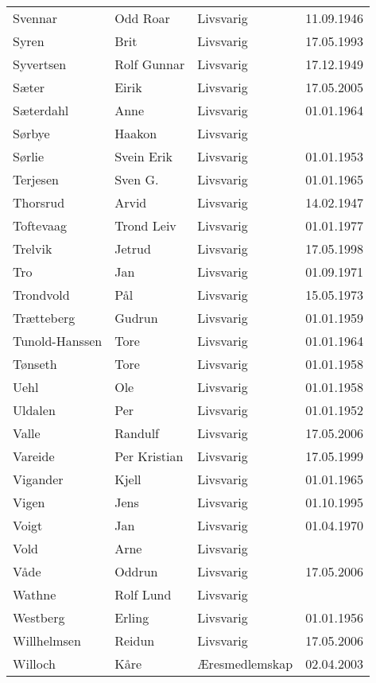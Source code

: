 \begin{longtable}{llll}
        Svennar	&	Odd Roar	&	Livsvarig 	&	11.09.1946	\\
        Syren	&	Brit	&	Livsvarig 	&	17.05.1993	\\
        Syvertsen	&	Rolf Gunnar	&	Livsvarig 	&	17.12.1949	\\
        Sæter 	&	Eirik	&	Livsvarig	&	17.05.2005	\\
        Sæterdahl	&	Anne	&	Livsvarig 	&	01.01.1964	\\
        Sørbye	&	Haakon	&	Livsvarig 	&		\\
        Sørlie	&	Svein Erik	&	Livsvarig 	&	01.01.1953	\\
        Terjesen	&	Sven G.	&	Livsvarig 	&	01.01.1965	\\
        Thorsrud	&	Arvid	&	Livsvarig 	&	14.02.1947	\\
        Toftevaag	&	Trond Leiv	&	Livsvarig 	&	01.01.1977	\\
        Trelvik 	&	Jetrud	&	Livsvarig	&	17.05.1998	\\
        Tro	&	Jan	&	Livsvarig 	&	01.09.1971	\\
        Trondvold	&	Pål	&	Livsvarig 	&	15.05.1973	\\
        Trætteberg	&	Gudrun	&	Livsvarig 	&	01.01.1959	\\
        Tunold-Hanssen	&	Tore	&	Livsvarig 	&	01.01.1964	\\
        Tønseth	&	Tore	&	Livsvarig 	&	01.01.1958	\\
        Uehl	&	Ole	&	Livsvarig 	&	01.01.1958	\\
        Uldalen	&	Per	&	Livsvarig 	&	01.01.1952	\\
        Valle	&	Randulf	&	Livsvarig	&	17.05.2006	\\
        Vareide 	&	Per Kristian	&	Livsvarig	&	17.05.1999	\\
        Vigander	&	Kjell	&	Livsvarig 	&	01.01.1965	\\
        Vigen 	&	Jens	&	Livsvarig	&	01.10.1995	\\
        Voigt	&	Jan	&	Livsvarig 	&	01.04.1970	\\
        Vold	&	Arne	&	Livsvarig 	&		\\
        Våde	&	Oddrun	&	Livsvarig	&	17.05.2006	\\
        Wathne	&	Rolf Lund	&	Livsvarig 	&		\\
        Westberg	&	Erling	&	Livsvarig 	&	01.01.1956	\\
        Willhelmsen	&	Reidun	&	Livsvarig	&	17.05.2006	\\
        Willoch	&	Kåre	&	Æresmedlemskap	&	02.04.2003	\\

\end{longtable}
